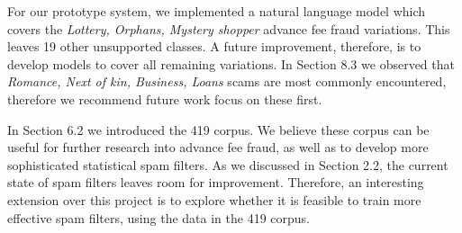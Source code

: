 For our prototype system, we implemented a natural language model which covers the \textit{Lottery, Orphans, Mystery shopper} advance fee fraud variations. This leaves 19 other unsupported classes. A future improvement, therefore, is to develop models to cover all remaining variations. In Section 8.3 we observed that \textit{Romance, Next of kin, Business, Loans} scams are most commonly encountered, therefore we recommend future work focus on these first.

In Section 6.2 we introduced the 419 corpus. We believe these corpus can be useful for further research into advance fee fraud, as well as to develop more sophisticated statistical spam filters. As we discussed in Section 2.2, the current state of spam filters leaves room for improvement. Therefore, an interesting extension over this project is to explore whether it is feasible to train more effective spam filters, using the data in the 419 corpus.